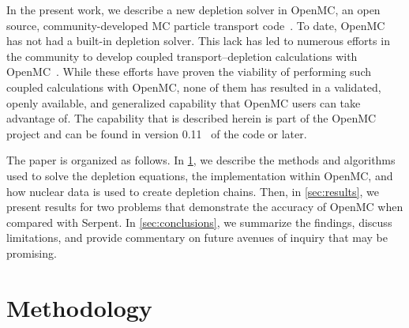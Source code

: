 \documentclass[3p,authoryear]{elsarticle}
\begin{document}
In the present work, we describe a new depletion solver in OpenMC, an open
source, community-developed MC particle transport code~\citep{romano2015ane1}.
To date, OpenMC has not had a built-in depletion solver. This lack has led to
numerous efforts in the community to develop coupled transport--depletion
calculations with OpenMC~\citep{gul2017ane, lanversin2017icone,
lanversin2019phd, liu2019nst, zhuang2020pne, zhao2020ned, zhao2020cpc,
zhang2020ane}. While these efforts have proven the viability of performing such
coupled calculations with OpenMC, none of them has resulted in a validated,
openly available, and generalized capability that OpenMC users can take
advantage of. The capability that is described herein is part of the OpenMC
project and can be found in version 0.11~\citep{openmc-0110} of the code or
later.

The paper is organized as follows. In \cref{sec:methods}, we describe the
methods and algorithms used to solve the depletion equations, the implementation
within OpenMC, and how nuclear data is used to create depletion chains. Then, in
\cref{sec:results}, we present results for two problems that demonstrate the
accuracy of OpenMC when compared with Serpent. In \cref{sec:conclusions}, we
summarize the findings, discuss limitations, and provide commentary on future
avenues of inquiry that may be promising.

\section{Methodology}
\label{sec:methods}
\end{document}
